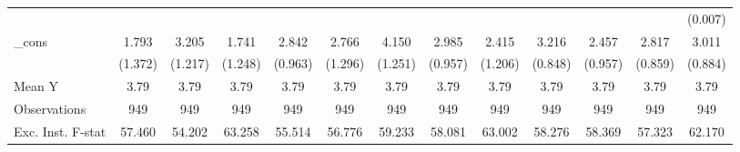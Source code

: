 {\begin{tabular}{l*{12}{c}}
            &                     &                     &                     &                     &                     &                     &                     &                     &                     &                     &                     &     (0.007)         \\
\addlinespace
\_cons      &       1.793         &       3.205\sym{**} &       1.741         &       2.842\sym{***}&       2.766\sym{**} &       4.150\sym{***}&       2.985\sym{***}&       2.415\sym{*}  &       3.216\sym{***}&       2.457\sym{**} &       2.817\sym{***}&       3.011\sym{***}\\
            &     (1.372)         &     (1.217)         &     (1.248)         &     (0.963)         &     (1.296)         &     (1.251)         &     (0.957)         &     (1.206)         &     (0.848)         &     (0.957)         &     (0.859)         &     (0.884)         \\
\midrule
Mean Y      &        3.79         &        3.79         &        3.79         &        3.79         &        3.79         &        3.79         &        3.79         &        3.79         &        3.79         &        3.79         &        3.79         &        3.79         \\
Observations&         949         &         949         &         949         &         949         &         949         &         949         &         949         &         949         &         949         &         949         &         949         &         949         \\
Exc. Inst. F-stat&      57.460         &      54.202         &      63.258         &      55.514         &      56.776         &      59.233         &      58.081         &      63.002         &      58.276         &      58.369         &      57.323         &      62.170         \\
\bottomrule
\end{tabular}
}
